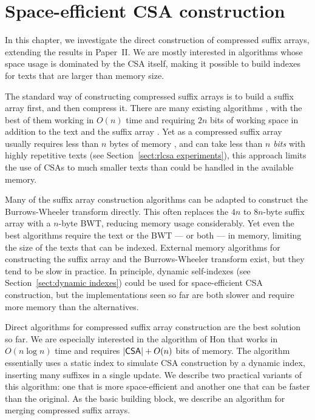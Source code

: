 \chapter{Space-efficient CSA construction}\label{chapter:construction}

In this chapter, we investigate the direct construction of compressed suffix arrays, extending the results in Paper~II. We are mostly interested in algorithms whose space usage is dominated by the CSA itself, making it possible to build indexes for texts that are larger than memory size.

The standard way of constructing compressed suffix arrays is to build a suffix array first, and then compress it. There are many existing algorithms \cite{Puglisi2007}, with the best of them working in $O(n)$ time and requiring $2n$ bits of working space in addition to the text and the suffix array \cite{Nong2009}. Yet as a compressed suffix array usually requires less than $n$ bytes of memory \cite{Ferragina2009a}, and can take less than $n$ \emph{bits} with highly repetitive texts (see Section~\ref{sect:rlcsa experiments}), this approach limits the use of CSAs to much smaller texts than could be handled in the available memory.

Many of the suffix array construction algorithms can be adapted to construct the Burrows-Wheeler transform directly. This often replaces the $4n$ to $8n$-byte suffix array with a $n$-byte BWT, reducing memory usage considerably. Yet even the best algorithms \cite{Kaerkkaeinen2007,Okanohara2009} require the text or the BWT --- or both --- in memory, limiting the size of the texts that can be indexed. External memory algorithms for constructing the suffix array \cite{Dementiev2008a} and the Burrows-Wheeler transform \cite{Ferragina2012} exist, but they tend to be slow in practice. In principle, dynamic self-indexes (see Section~\ref{sect:dynamic indexes}) could be used for space-efficient CSA construction, but the implementations seen so far are both slower and require more memory than the alternatives.

Direct algorithms for compressed suffix array construction \cite{Hon2007,Na2007,Hon2009} are the best solution so far. We are especially interested in the algorithm of Hon  that works in $O(n \log n)$ time and requires $\lvert \mathsf{CSA} \rvert + O(n)$ bits of memory. The algorithm essentially uses a static index to simulate CSA construction by a dynamic index, inserting many suffixes in a single update. We describe two practical variants of this algorithm: one that is more space-efficient and another one that can be faster than the original. As the basic building block, we describe an algorithm for merging compressed suffix arrays.

